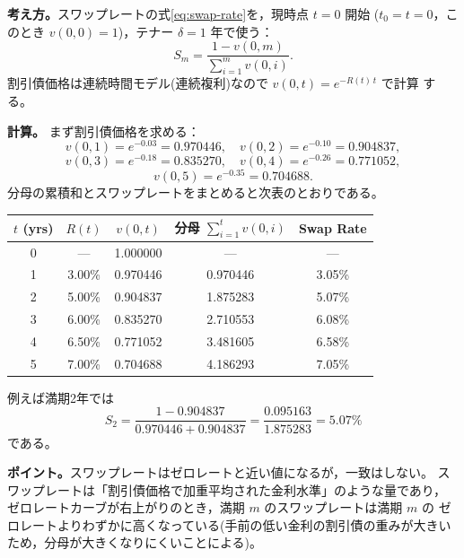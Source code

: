 \begin{answerbox}
\textbf{考え方。}スワップレートの式\eqref{eq:swap-rate}を，現時点 $t=0$ 開始
($t_0 = t = 0$，このとき $v(0,0)=1$)，テナー $\delta=1$ 年で使う：
\[
S_m = \frac{1 - v(0,m)}{\sum_{i=1}^{m}v(0,i)}.
\]
割引債価格は連続時間モデル(連続複利)なので $v(0,t) = e^{-R(t)\,t}$ で計算
する。

\medskip
\textbf{計算。}
まず割引債価格を求める：
\[
v(0,1) = e^{-0.03} = 0.970446,\quad
v(0,2) = e^{-0.10} = 0.904837,
\]
\[
v(0,3) = e^{-0.18} = 0.835270,\quad
v(0,4) = e^{-0.26} = 0.771052,
\]
\[
v(0,5) = e^{-0.35} = 0.704688.
\]
分母の累積和とスワップレートをまとめると次表のとおりである。
\vspace{0.9em}
\begin{center}
\begin{tabular}{ccccc}
\toprule
$t$ (yrs) & $R(t)$ & $v(0,t)$ & 分母 $\sum_{i=1}^{t}v(0,i)$ & Swap Rate\\
\midrule
0 & --- & 1.000000 & --- & ---\\
1 & 3.00\% & 0.970446 & 0.970446 & 3.05\%\\
2 & 5.00\% & 0.904837 & 1.875283 & 5.07\%\\
3 & 6.00\% & 0.835270 & 2.710553 & 6.08\%\\
4 & 6.50\% & 0.771052 & 3.481605 & 6.58\%\\
5 & 7.00\% & 0.704688 & 4.186293 & 7.05\%\\
\bottomrule
\end{tabular}
\end{center}
\vspace{0.9em}
例えば満期2年では
\[
S_2 = \frac{1 - 0.904837}{0.970446 + 0.904837} = \frac{0.095163}{1.875283}
= 5.07\%
\]
である。

\medskip
\textbf{ポイント。}スワップレートはゼロレートと近い値になるが，一致はしない。
スワップレートは「割引債価格で加重平均された金利水準」のような量であり，
ゼロレートカーブが右上がりのとき，満期 $m$ のスワップレートは満期 $m$ の
ゼロレートよりわずかに高くなっている(手前の低い金利の割引債の重みが大きい
ため，分母が大きくなりにくいことによる)。
\end{answerbox}

